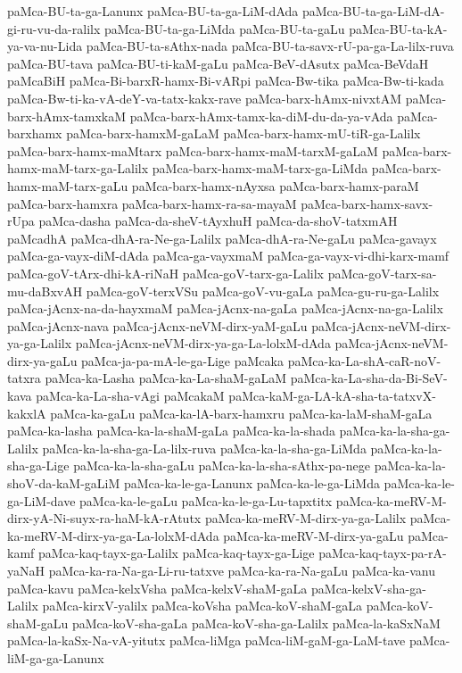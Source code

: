 {paMca-BU-ta-ga-Lanunx
paMca-BU-ta-ga-LiM-dAda
paMca-BU-ta-ga-LiM-dA-gi-ru-vu-da-ralilx
paMca-BU-ta-ga-LiMda
paMca-BU-ta-gaLu
paMca-BU-ta-kA-ya-va-nu-Lida
paMca-BU-ta-sAthx-nada
paMca-BU-ta-savx-rU-pa-ga-La-lilx-ruva
paMca-BU-tava
paMca-BU-ti-kaM-gaLu
paMca-BeV-dAsutx
paMca-BeVdaH
paMcaBiH
paMca-Bi-barxR-hamx-Bi-vARpi
paMca-Bw-tika
paMca-Bw-ti-kada
paMca-Bw-ti-ka-vA-deY-va-tatx-kakx-rave
paMca-barx-hAmx-nivxtAM
paMca-barx-hAmx-tamxkaM
paMca-barx-hAmx-tamx-ka-diM-du-da-ya-vAda
paMca-barxhamx
paMca-barx-hamxM-gaLaM
paMca-barx-hamx-mU-tiR-ga-Lalilx
paMca-barx-hamx-maMtarx
paMca-barx-hamx-maM-tarxM-gaLaM
paMca-barx-hamx-maM-tarx-ga-Lalilx
paMca-barx-hamx-maM-tarx-ga-LiMda
paMca-barx-hamx-maM-tarx-gaLu
paMca-barx-hamx-nAyxsa
paMca-barx-hamx-paraM
paMca-barx-hamxra
paMca-barx-hamx-ra-sa-mayaM
paMca-barx-hamx-savx-rUpa
paMca-dasha
paMca-da-sheV-tAyxhuH
paMca-da-shoV-tatxmAH
paMcadhA
paMca-dhA-ra-Ne-ga-Lalilx
paMca-dhA-ra-Ne-gaLu
paMca-gavayx
paMca-ga-vayx-diM-dAda
paMca-ga-vayxmaM
paMca-ga-vayx-vi-dhi-karx-mamf
paMca-goV-tArx-dhi-kA-riNaH
paMca-goV-tarx-ga-Lalilx
paMca-goV-tarx-sa-mu-daBxvAH
paMca-goV-terxVSu
paMca-goV-vu-gaLa
paMca-gu-ru-ga-Lalilx
paMca-jAcnx-na-da-hayxmaM
paMca-jAcnx-na-gaLa
paMca-jAcnx-na-ga-Lalilx
paMca-jAcnx-nava
paMca-jAcnx-neVM-dirx-yaM-gaLu
paMca-jAcnx-neVM-dirx-ya-ga-Lalilx
paMca-jAcnx-neVM-dirx-ya-ga-La-lolxM-dAda
paMca-jAcnx-neVM-dirx-ya-gaLu
paMca-ja-pa-mA-le-ga-Lige
paMcaka
paMca-ka-La-shA-caR-noV-tatxra
paMca-ka-Lasha
paMca-ka-La-shaM-gaLaM
paMca-ka-La-sha-da-Bi-SeV-kava
paMca-ka-La-sha-vAgi
paMcakaM
paMca-kaM-ga-LA-kA-sha-ta-tatxvX-kakxlA
paMca-ka-gaLu
paMca-ka-lA-barx-hamxru
paMca-ka-laM-shaM-gaLa
paMca-ka-lasha
paMca-ka-la-shaM-gaLa
paMca-ka-la-shada
paMca-ka-la-sha-ga-Lalilx
paMca-ka-la-sha-ga-La-lilx-ruva
paMca-ka-la-sha-ga-LiMda
paMca-ka-la-sha-ga-Lige
paMca-ka-la-sha-gaLu
paMca-ka-la-sha-sAthx-pa-nege
paMca-ka-la-shoV-da-kaM-gaLiM
paMca-ka-le-ga-Lanunx
paMca-ka-le-ga-LiMda
paMca-ka-le-ga-LiM-dave
paMca-ka-le-gaLu
paMca-ka-le-ga-Lu-tapxtitx
paMca-ka-meRV-M-dirx-yA-Ni-suyx-ra-haM-kA-rAtutx
paMca-ka-meRV-M-dirx-ya-ga-Lalilx
paMca-ka-meRV-M-dirx-ya-ga-La-lolxM-dAda
paMca-ka-meRV-M-dirx-ya-gaLu
paMca-kamf
paMca-kaq-tayx-ga-Lalilx
paMca-kaq-tayx-ga-Lige
paMca-kaq-tayx-pa-rA-yaNaH
paMca-ka-ra-Na-ga-Li-ru-tatxve
paMca-ka-ra-Na-gaLu
paMca-ka-vanu
paMca-kavu
paMca-kelxVsha
paMca-kelxV-shaM-gaLa
paMca-kelxV-sha-ga-Lalilx
paMca-kirxV-yalilx
paMca-koVsha
paMca-koV-shaM-gaLa
paMca-koV-shaM-gaLu
paMca-koV-sha-gaLa
paMca-koV-sha-ga-Lalilx
paMca-la-kaSxNaM
paMca-la-kaSx-Na-vA-yitutx
paMca-liMga
paMca-liM-gaM-ga-LaM-tave
paMca-liM-ga-ga-Lanunx
}
